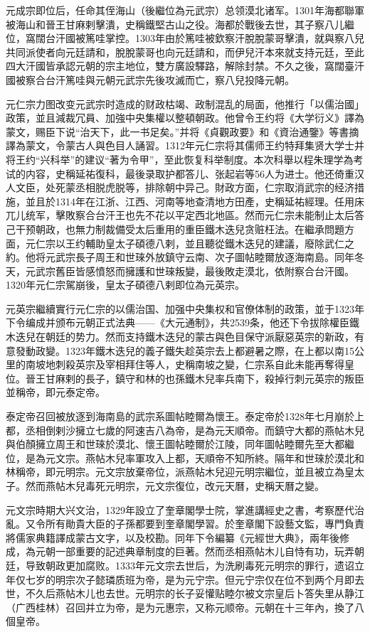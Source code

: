 元成宗即位后，任命其侄海山（後繼位為元武宗）总领漠北诸军。1301年海都聯軍被海山和晉王甘麻剌擊潰，史稱鐵堅古山之役。海都於戰後去世，其子察八儿繼位，窩闊台汗國被篤哇掌控。1303年由於篤哇被欽察汗脫脫蒙哥擊潰，就與察八兒共同派使者向元廷請和，脫脫蒙哥也向元廷請和，而伊兒汗本來就支持元廷，至此四大汗國皆承認元朝的宗主地位，雙方廣設驛路，解除封禁。不久之後，窩闊臺汗國被察合台汗篤哇與元朝元武宗先後攻滅而亡，察八兒投降元朝。

元仁宗力图改变元武宗时造成的财政枯竭、政制混乱的局面，他推行「以儒治國」政策，並且減裁冗員、加強中央集權以整頓朝政。他曾令王约将《大学衍义》譯為蒙文，赐臣下说“治天下，此一书足矣。”并将《貞觀政要》和《資治通鑒》等書摘譯為蒙文，令蒙古人與色目人誦習。1312年元仁宗将其儒师王约特拜集贤大学士并将王约“兴科举”的建议“著为令甲”，至此恢复科举制度。本次科舉以程朱理学為考试的内容，史稱延祐復科，最後录取护都答儿、张起岩等56人为进士。他还倚重汉人文臣，处死蒙丞相脱虎脱等，排除朝中异己。財政方面，仁宗取消武宗的经济措施，並且於1314年在江浙、江西、河南等地查清地方田產，史稱延祐經理。任用床兀儿统军，擊敗察合台汗王也先不花以平定西北地區。然而元仁宗未能制止太后答己干预朝政，也無力制裁備受太后重用的重臣鐵木迭兒贪赃枉法。在繼承問題方面，元仁宗以王约輔助皇太子碩德八剌，並且聽從鐵木迭兒的建議，廢除武仁之約。他将元武宗長子周王和世琜外放鎮守云南、次子圖帖睦爾放逐海南島。同年冬天，元武宗舊臣皆感憤怒而擁護和世琜叛變，最後敗走漠北，依附察合台汗國。1320年元仁宗駕崩後，皇太子碩德八剌即位為元英宗。

元英宗繼續實行元仁宗的以儒治国、加强中央集权和官僚体制的政策，並于1323年下令编成并颁布元朝正式法典——《大元通制》，共2539条，他还下令拔除權臣鐵木迭兒在朝廷的势力。然而支持鐵木迭兒的蒙古與色目保守派厭惡英宗的新政，有意發動政變。1323年鐵木迭兒的義子鐵失趁英宗去上都避暑之際，在上都以南15公里的南坡地刺殺英宗及宰相拜住等人，史稱南坡之變，仁宗系自此未能再奪得皇位。晉王甘麻剌的長子，鎮守和林的也孫鐵木兒率兵南下，殺掉行刺元英宗的叛臣並稱帝，即元泰定帝。

泰定帝召回被放逐到海南島的武宗系圖帖睦爾為懷王。泰定帝於1328年七月崩於上都，丞相倒剌沙擁立七歲的阿速吉八為帝，是為元天順帝。而鎮守大都的燕帖木兒與伯顏擁立周王和世琜於漠北、懷王圖帖睦爾於江陵，同年圖帖睦爾先至大都繼位，是為元文宗。燕帖木兒率軍攻入上都，天順帝不知所終。隔年和世琜於漠北和林稱帝，即元明宗。元文宗放棄帝位，派燕帖木兒迎元明宗繼位，並且被立為皇太子。然而燕帖木兒毒死元明宗，元文宗復位，改元天曆，史稱天曆之變。

元文宗時期大兴文治，1329年設立了奎章閣學士院，掌進講經史之書，考察歷代治亂。又令所有勛貴大臣的子孫都要到奎章閣學習。於奎章閣下設藝文監，專門負責將儒家典籍譯成蒙古文字，以及校勘。同年下令編纂《元經世大典》，兩年後修成，為元朝一部重要的記述典章制度的巨著。然而丞相燕帖木儿自恃有功，玩弄朝廷，导致朝政更加腐败。1333年元文宗去世后，为洗刷毒死元明宗的罪行，遗诏立年仅七岁的明宗次子懿璘质班为帝，是为元宁宗。但元宁宗仅在位不到两个月即去世，不久后燕帖木儿也去世。元明宗的长子妥懽贴睦尔被文宗皇后卜答失里从静江（广西桂林）召回并立为帝，是为元惠宗，又称元顺帝。元朝在十三年內，換了八個皇帝。

